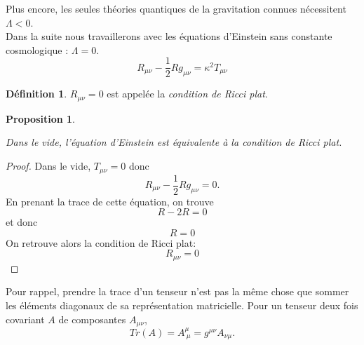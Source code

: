 \documentclass[a4paper,11pt]{report}
\theoremstyle{definition}
\theoremstyle{plain}
\newtheorem{prop}[thm]{Proposition}
\theoremstyle{definition}
\newtheorem{defn}{Définition}[chapter]
\theoremstyle{remark}
\begin{document}
            Plus encore, les seules théories quantiques de la gravitation connues nécessitent $\Lambda<0$.\\
            
            Dans la suite nous travaillerons avec les équations d'Einstein sans constante cosmologique : $\Lambda = 0$.
            \begin{equation}
                R_{\mu\nu}-\frac{1}{2}Rg_{\mu\nu} = \kappa^2 T_{\mu\nu}
            \end{equation}
            
            \begin{defn}
                $R_{\mu\nu} = 0$ est appelée la \textit{condition de Ricci plat}.
            \end{defn}
            
            \begin{prop}\begin{leftbar}
                Dans le vide, l'équation d'Einstein est équivalente à la \textit{condition de Ricci plat}.
            \end{leftbar}\end{prop}
            
            \begin{proof}
                Dans le vide, $T_{\mu\nu}=0$ donc
                \begin{equation}
                    R_{\mu\nu}-\frac{1}{2}Rg_{\mu\nu} = 0.
                \end{equation}
                En prenant la trace de cette équation, on trouve
                \begin{equation}
                    R-2R = 0
                \end{equation}
                et donc
                \begin{equation}
                    R = 0
                \end{equation}
                On retrouve alors la condition de Ricci plat:
                \begin{equation}
                    R_{\mu\nu} = 0
                \end{equation}
            \end{proof}
            Pour rappel, prendre la trace d'un tenseur n'est pas la même chose que sommer les éléments diagonaux de sa représentation matricielle. Pour un tenseur deux fois covariant $A$ de composantes $A_{\mu\nu}$, 
            \begin{equation}
                Tr(A) = A^\mu_{~\mu} = g^{\mu\nu}A_{\nu\mu}.
            \end{equation}
            
\end{document}
